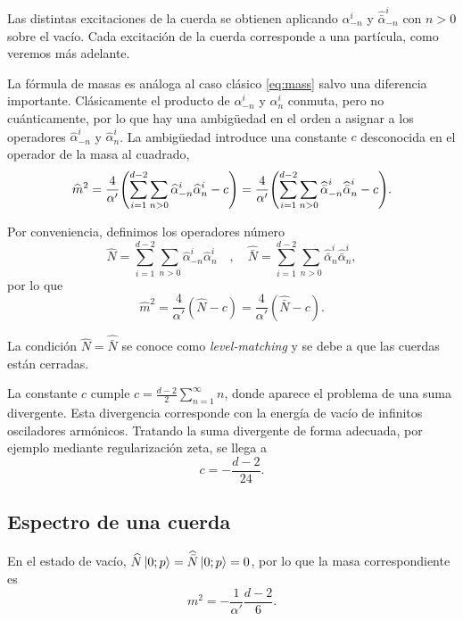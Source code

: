 Las distintas excitaciones de la cuerda se obtienen aplicando $\alpha_{-n}^i$ y $\widehat{\bar\alpha}_{-n}^i$
con $n>0$ sobre el vacío.
Cada excitación de la cuerda corresponde a una partícula, como veremos más adelante.

La fórmula de masas es análoga al caso clásico \ref{eq:mass} salvo una diferencia importante.
Clásicamente el producto de $\alpha^i_{-n}$ y $\alpha^i_n$ conmuta, pero no cuánticamente, por lo que hay una 
ambigüedad en el orden a asignar a los operadores $\widehat\alpha^i_{-n}$ y $\widehat \alpha^i_n$.
La ambigüedad introduce una constante $c$ desconocida en el operador de la masa al cuadrado,
\begin{equation}
  \widehat m^2 = \frac{4}{\alpha'}\qty(\sum_{i=1}^{d-2} \sum_{n>0} \widehat \alpha_{-n}^i \widehat\alpha_n^i -c)
  = \frac{4}{\alpha'}\qty(\sum_{i=1}^{d-2} \sum_{n>0} \widehat{\bar \alpha}_{-n}^i\widehat{\bar \alpha}_n^i -c).
\end{equation}

Por conveniencia, definimos los operadores número
\begin{equation}
  \widehat N=\sum_{i=1}^{d-2} \sum_{n>0}\widehat \alpha_{-n}^i\widehat\alpha_n^i \quad , \quad   
  \widehat {\bar N}=\sum_{i=1}^{d-2} \sum_{n>0} \widehat{\bar \alpha}_n^i\widehat{ \bar\alpha}_n^i, 
\end{equation}
por lo que 
\begin{equation}
  \widehat m^2 = \frac{4}{\alpha'} (\widehat N -c ) = \frac{4}{\alpha'} (\widehat{\bar N} -c).
  \label{eq:massdef}
\end{equation}

La condición $\widehat N=\widehat {\bar N}$ se conoce como \emph{level-matching} y
se debe a que las cuerdas están cerradas.

La constante $c$ cumple $c=\frac{d-2}{2} \sum_{n=1}^\infty n$, donde aparece el problema de
una suma divergente.
Esta divergencia corresponde con la energía de vacío de infinitos osciladores armónicos.
Tratando la suma divergente de forma adecuada, por ejemplo mediante regularización zeta, se llega a
\begin{equation}
  c=-\frac{d-2}{24}.
\end{equation}

\subsection{Espectro de una cuerda}
En el estado de vacío, $\widehat N\ket{0;p}=\widehat {\bar N}\ket{0;p}=0$, por lo que la masa correspondiente es
\begin{equation}
  m^2 = -\frac{1}{\alpha'}\frac{d-2}{6}.
\end{equation}

